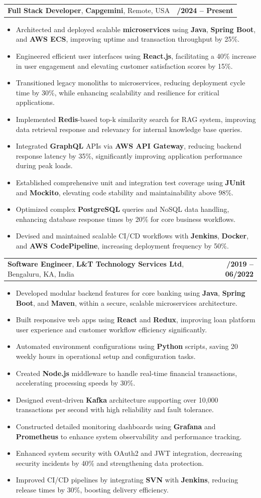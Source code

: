 \documentclass[letterpaper,11pt]{article}
\makeatletter
\newcommand{\resumeItem}[1]{
  \item\footnotesize{
    {#1 \vspace{-2pt}}
  }
}
\newcommand{\resumeSubheading}[4]{
  \vspace{-2pt}\item
    \begin{tabular*}{1.0\textwidth}[t]{l@{\extracolsep{\fill}}r}
      \textbf{\fontsize{10pt}{14pt}\selectfont #3}, \textbf{\fontsize{10pt}{14pt}\selectfont #1}, \fontsize{10pt}{14pt}\selectfont #4 & \textbf{\fontsize{10pt}{14pt}\selectfont #2} \\
    \end{tabular*}\vspace{-7pt}
}
\newcommand{\resumeItemListStart}{\begin{itemize}[leftmargin=*]}
\newcommand{\resumeItemListEnd}{\end{itemize}\vspace{-5pt}}
\makeatother
\begin{document}
    \resumeSubheading
        {Capgemini}{01/2024 -- Present}
        {Full Stack Developer}{Remote, USA}
      \resumeItemListStart
        \resumeItem{Architected and deployed scalable \textbf{microservices} using \textbf{Java}, \textbf{Spring Boot}, and \textbf{AWS ECS}, improving uptime and transaction throughput by 25\%.}
        \resumeItem{Engineered efficient user interfaces using \textbf{React.js}, facilitating a 40\% increase in user engagement and elevating customer satisfaction scores by 15\%.}
        \resumeItem{Transitioned legacy monoliths to microservices, reducing deployment cycle time by 30\%, while enhancing scalability and resilience for critical applications.}
        \resumeItem{Implemented \textbf{Redis}-based top-k similarity search for RAG system, improving data retrieval response and relevancy for internal knowledge base queries.}
        \resumeItem{Integrated \textbf{GraphQL} APIs via \textbf{AWS API Gateway}, reducing backend response latency by 35\%, significantly improving application performance during peak loads.}
        \resumeItem{Established comprehensive unit and integration test coverage using \textbf{JUnit} and \textbf{Mockito}, elevating code stability and maintainability above 98\%.}
        \resumeItem{Optimized complex \textbf{PostgreSQL} queries and NoSQL data handling, enhancing database response times by 20\% for core business workflows.}
        \resumeItem{Devised and maintained scalable CI/CD workflows with \textbf{Jenkins}, \textbf{Docker}, and \textbf{AWS CodePipeline}, increasing deployment frequency by 50\%.}
      \resumeItemListEnd

    \resumeSubheading
        {L\&T Technology Services Ltd}{08/2019 -- 06/2022}
        {Software Engineer}{Bengaluru, KA, India}
      \resumeItemListStart
        \resumeItem{Developed modular backend features for core banking using \textbf{Java}, \textbf{Spring Boot}, and \textbf{Maven}, within a secure, scalable microservices architecture.}
        \resumeItem{Built responsive web apps using \textbf{React} and \textbf{Redux}, improving loan platform user experience and customer workflow efficiency significantly.}
        \resumeItem{Automated environment configurations using \textbf{Python} scripts, saving 20 weekly hours in operational setup and configuration tasks.}
        \resumeItem{Created \textbf{Node.js} middleware to handle real-time financial transactions, accelerating processing speeds by 30\%.}
        \resumeItem{Designed event-driven \textbf{Kafka} architecture supporting over 10,000 transactions per second with high reliability and fault tolerance.}
        \resumeItem{Constructed detailed monitoring dashboards using \textbf{Grafana} and \textbf{Prometheus} to enhance system observability and performance tracking.}
        \resumeItem{Enhanced system security with OAuth2 and JWT integration, decreasing security incidents by 40\% and strengthening data protection.}
        \resumeItem{Improved CI/CD pipelines by integrating \textbf{SVN} with \textbf{Jenkins}, reducing release times by 30\%, boosting delivery efficiency.}
      \resumeItemListEnd
\end{document}
